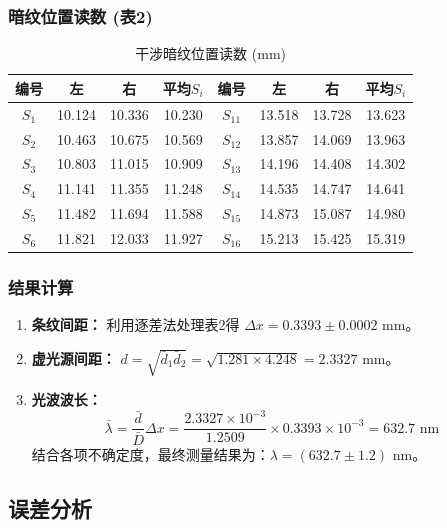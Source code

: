 \documentclass[]{../../templates/Report}%
\begin{document}
\begin{fullreportonly}
\subsubsection{暗纹位置读数 (表2)}
\begin{table}[H]
\centering
\caption{干涉暗纹位置读数 (mm)}
\begin{tabular}{cccc|cccc}
\toprule
编号 & 左 & 右 & 平均$S_i$ & 编号 & 左 & 右 & 平均$S_i$ \\
\midrule
$S_1$ & 10.124 & 10.336 & 10.230 & $S_{11}$ & 13.518 & 13.728 & 13.623 \\
$S_2$ & 10.463 & 10.675 & 10.569 & $S_{12}$ & 13.857 & 14.069 & 13.963 \\
$S_3$ & 10.803 & 11.015 & 10.909 & $S_{13}$ & 14.196 & 14.408 & 14.302 \\
$S_4$ & 11.141 & 11.355 & 11.248 & $S_{14}$ & 14.535 & 14.747 & 14.641 \\
$S_5$ & 11.482 & 11.694 & 11.588 & $S_{15}$ & 14.873 & 15.087 & 14.980 \\
$S_6$ & 11.821 & 12.033 & 11.927 & $S_{16}$ & 15.213 & 15.425 & 15.319 \\
\bottomrule
\end{tabular}
\end{table}

\subsubsection{结果计算}
\begin{enumerate}
    \item \textbf{条纹间距：} 利用逐差法处理表2得 $\Delta x = 0.3393 \pm 0.0002$ mm。
    \item \textbf{虚光源间距：} $d = \sqrt{\bar{d}_1 \bar{d}_2} = \sqrt{1.281 \times 4.248} = 2.3327$ mm。
    \item \textbf{光波波长：}
    \[ \bar{\lambda} = \frac{\bar{d}}{\bar{D}} \Delta x = \frac{2.3327 \times 10^{-3}}{1.2509} \times 0.3393 \times 10^{-3} = 632.7 \text{ nm} \]
    结合各项不确定度，最终测量结果为：$\lambda = (632.7 \pm 1.2)$ nm。
\end{enumerate}


\subsection{误差分析}


\end{fullreportonly}
\end{document}
